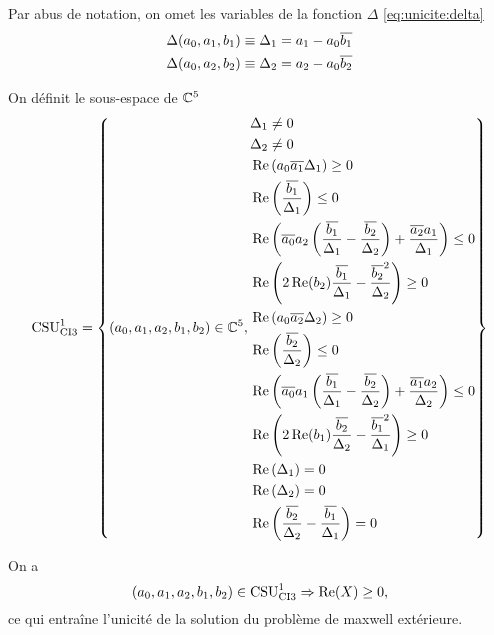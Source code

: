   Par abus de notation, on omet les variables de la fonction \(\Delta\) \eqref{eq:unicite:delta} 
  \begin{align*}
     \Delta(a_0,a_1,b_1) &\equiv \Delta_1 = a_1 - a_0\conj{b_1}
     \\
     \Delta(a_0,a_2,b_2) &\equiv \Delta_2 = a_2 - a_0\conj{b_2}
  \end{align*}

  \begin{defn}
    \label{def:csu:ci3-1}

    On définit le sous-espace de \(\CC^5\)
    \begin{equation*}
      \CSU[1]{CI3} = \left\lbrace 
      (a_0,a_1,a_2,b_1,b_2) \in \CC^5,
      \begin{aligned}
      &\Delta_1 \not = 0
      \\
      &\Delta_2 \not = 0
      \\
      &\Re\left(a_0\conj{a_1}\Delta_1\right) \ge 0
      \\
      &\Re\left(\frac{\conj{b_1}}{\Delta_1}\right) \le 0
      \\
      &\Re\left(\conj{a_0}a_2\left(\frac{\conj{b_1}}{\Delta_1}-\frac{\conj{b_2}}{\Delta_2}\right) + \frac{\conj{a_2}a_1}{\Delta_1} \right)\le 0
      \\
      &\Re\left(2\Re(b_2)\frac{\conj{b_1}}{\Delta_1}-\frac{\conj{b_2}^2}{\Delta_2}\right) \ge 0
      \\
      &\Re\left(a_0\conj{a_2}\Delta_2\right) \ge 0
      \\
      &\Re\left(\frac{\conj{b_2}}{\Delta_2}\right) \le 0
      \\
      &\Re\left(\conj{a_0}a_1\left(\frac{\conj{b_1}}{\Delta_1}-\frac{\conj{b_2}}{\Delta_2}\right) + \frac{\conj{a_1}a_2}{\Delta_2} \right)\le 0
      \\
      &\Re\left(2\Re(b_1)\frac{\conj{b_2}}{\Delta_2}-\frac{\conj{b_1}^2}{\Delta_1}\right) \ge 0
      \\
      &\Re\left(\Delta_1\right) = 0
      \\
      &\Re\left(\Delta_2\right) = 0
      \\
      &\Re\left(\frac{\conj{b_2}}{\Delta_2}-\frac{\conj{b_1}}{\Delta_1}\right) = 0
      \end{aligned}
      \right\rbrace
    \end{equation*}
  \end{defn}
  
 \begin{prop}
    \label{prop:csu:ci3-1}
    On a 
    \begin{equation*}
      (a_0,a_1,a_2,b_1,b_2) \in \CSU[1]{CI3} \Rightarrow \Re(X)\ge 0,
    \end{equation*}
    ce qui entraîne l'unicité de la solution du problème de maxwell extérieure.
  \end{prop}

